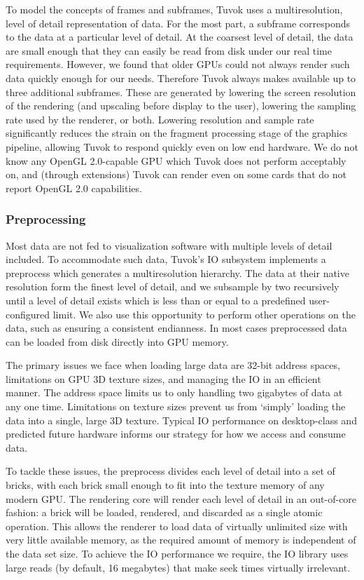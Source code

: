 To model the concepts of frames and subframes, Tuvok
uses a multiresolution, level of detail representation of data.
For the most part, a subframe corresponds to the data at
a particular level of detail. At the coarsest level of detail,
the data are small enough that they can easily be read from
disk under our real time requirements. However, we found
that older GPUs could not always render such data quickly
enough for our needs. Therefore Tuvok always makes available
up to three additional subframes. These are generated
by lowering the screen resolution of the rendering (and upscaling
before display to the user), lowering the sampling
rate used by the renderer, or both. Lowering resolution and
sample rate significantly reduces the strain on the fragment
processing stage of the graphics pipeline, allowing Tuvok
to respond quickly even on low end hardware. We do not
know any OpenGL 2.0-capable GPU which Tuvok does not
perform acceptably on, and (through extensions) Tuvok can
render even on some cards that do not report OpenGL 2.0
capabilities.

\subsubsection{Preprocessing}

Most data are not fed to visualization software with multiple
levels of detail included. To accommodate such data, Tuvok's IO
subsystem implements a preprocess which generates a multiresolution
hierarchy. The data at their native resolution form the finest level
of detail, and we subsample by two recursively until a level of detail
exists which is less than or equal to a predefined user-configured
limit. We also use this opportunity to perform other operations on
the data, such as ensuring a consistent endianness.  In most cases
preprocessed data can be loaded from disk directly into GPU memory.

The primary issues we face when loading large data are
32-bit address spaces, limitations on GPU 3D texture sizes,
and managing the IO in an efficient manner. The address
space limits us to only handling two gigabytes of data at any
one time. Limitations on texture sizes prevent us from `simply'
loading the data into a single, large 3D texture. Typical
IO performance on desktop-class and predicted future hardware
informs our strategy for how we access and consume
data.

To tackle these issues, the preprocess divides each level of
detail into a set of bricks, with each brick small enough to fit
into the texture memory of any modern GPU. The rendering
core will render each level of detail in an out-of-core fashion:
a brick will be loaded, rendered, and discarded as a single
atomic operation. This allows the renderer to load data of
virtually unlimited size with very little available memory, as
the required amount of memory is independent of the data
set size. To achieve the IO performance we require, the IO
library uses large reads (by default, 16 megabytes) that make
seek times virtually irrelevant.

